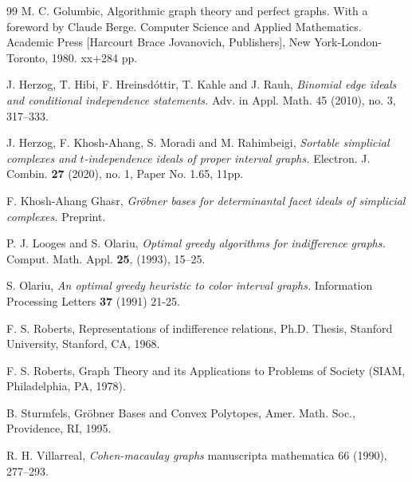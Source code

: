 \documentclass[12pt,reqno]{amsart}
\theoremstyle{plain}
\theoremstyle{definition}
\numberwithin{equation}{section}
\begin{document}
\begin{thebibliography}{99}
 M. C. Golumbic, Algorithmic graph theory and perfect graphs. With a foreword by Claude Berge. Computer Science and Applied Mathematics. Academic Press [Harcourt Brace Jovanovich, Publishers],  New York-London-Toronto, 1980. {\rm xx}+284 pp.

 J. Herzog, T. Hibi, F. Hreinsd\'{o}ttir, T. Kahle and J. Rauh, {\it Binomial edge ideals and conditional independence statements.}  Adv. in Appl. Math. 45 (2010), no. 3, 317--333.

 J. Herzog, F. Khosh-Ahang, S. Moradi and M. Rahimbeigi, {\it Sortable simplicial complexes and $t$-independence ideals of proper interval graphs.} Electron. J. Combin. {\bf 27} (2020), no. 1, Paper No. 1.65, 11pp.

 F. Khosh-Ahang Ghasr, {\it Gr\"{o}bner bases for determinantal facet ideals of simplicial complexes.} Preprint.

 P. J. Looges and S. Olariu, {\it Optimal greedy algorithms for indifference graphs.} Comput. Math. Appl. \textbf{25}, (1993), 15–25.

  S. Olariu, {\it An optimal greedy heuristic to color interval graphs.} Information Processing Letters {\bf 37} (1991) 21-25.

 F. S. Roberts,  Representations of indifference relations, Ph.D. Thesis, Stanford University, Stanford, CA, 1968.

 F. S. Roberts, Graph Theory and its Applications to Problems of Society (SIAM, Philadelphia, PA, 1978).

 B. Sturmfels, Gr\"{o}bner Bases and Convex Polytopes, Amer. Math. Soc., Providence,
RI, 1995.

 R. H. Villarreal, {\it Cohen-macaulay graphs} manuscripta mathematica 66 (1990), 277–293.

\end{thebibliography}


\end{document}
